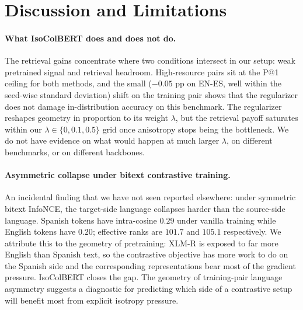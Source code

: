 \section{Discussion and Limitations}
\label{sec:discussion}

\paragraph{What IsoColBERT does and does not do.} The retrieval gains concentrate where two conditions intersect in our setup: weak pretrained signal and retrieval headroom. High-resource pairs sit at the P@1 ceiling for both methods, and the small ($-0.05$ pp on EN-ES, well within the seed-wise standard deviation) shift on the training pair shows that the regularizer does not damage in-distribution accuracy on this benchmark. The regularizer reshapes geometry in proportion to its weight $\lambda$, but the retrieval payoff saturates within our $\lambda \in \{0, 0.1, 0.5\}$ grid once anisotropy stops being the bottleneck. We do not have evidence on what would happen at much larger $\lambda$, on different benchmarks, or on different backbones.

\paragraph{Asymmetric collapse under bitext contrastive training.} An incidental finding that we have not seen reported elsewhere: under symmetric bitext InfoNCE, the target-side language collapses harder than the source-side language. Spanish tokens have intra-cosine $0.29$ under vanilla training while English tokens have $0.20$; effective ranks are $101.7$ and $105.1$ respectively. We attribute this to the geometry of pretraining: XLM-R is exposed to far more English than Spanish text, so the contrastive objective has more work to do on the Spanish side and the corresponding representations bear most of the gradient pressure. IsoColBERT closes the gap. The geometry of training-pair language asymmetry suggests a diagnostic for predicting which side of a contrastive setup will benefit most from explicit isotropy pressure.

